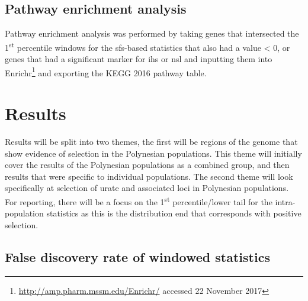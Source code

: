 \documentclass[]{report}
\begin{document}
\subsection{Pathway enrichment
analysis}\label{pathway-enrichment-analysis}

Pathway enrichment analysis was performed by taking genes that
intersected the 1\textsuperscript{st} percentile windows for the
\glsdesc{sfs}-based statistics that also had a value \textless{} 0, or
genes that had a significant marker for \gls{ihs} or \gls{nsl} and
inputting them into Enrichr\footnote{\url{http://amp.pharm.mssm.edu/Enrichr/}
  accessed 22 November 2017} \citep{Chen2013b, Kuleshov2016} and
exporting the KEGG 2016 pathway table.




\section{Results}\label{results}

Results will be split into two themes, the first will be regions of the
genome that show evidence of selection in the Polynesian populations.
This theme will initially cover the results of the Polynesian
populations as a combined group, and then results that were specific to
individual populations. The second theme will look specifically at
selection of urate and associated loci in Polynesian populations. For
reporting, there will be a focus on the 1\textsuperscript{st}
percentile/lower tail for the intra-population statistics as this is the
distribution end that corresponds with positive selection.

\subsection{False discovery rate of windowed
statistics}\label{fdrresults}
\end{document}
